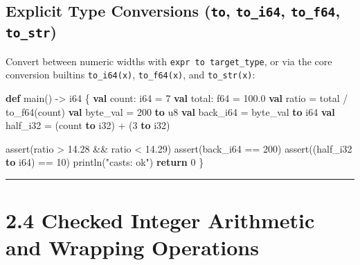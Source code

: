 \documentclass[
  english,
  oneside]{book}
\newenvironment{Shaded}{\begin{snugshade}}{\end{snugshade}}
\newcommand{\ControlFlowTok}[1]{\textcolor[rgb]{0.77,0.53,0.75}{\textbf{#1}}}
\newcommand{\DataTypeTok}[1]{\textcolor[rgb]{0.31,0.79,0.69}{#1}}
\newcommand{\DecValTok}[1]{\textcolor[rgb]{0.71,0.81,0.66}{#1}}
\newcommand{\FloatTok}[1]{\textcolor[rgb]{0.71,0.81,0.66}{#1}}
\newcommand{\FunctionTok}[1]{\textcolor[rgb]{0.86,0.86,0.67}{#1}}
\newcommand{\KeywordTok}[1]{\textcolor[rgb]{0.34,0.61,0.84}{\textbf{#1}}}
\newcommand{\NormalTok}[1]{\textcolor[rgb]{0.83,0.83,0.83}{#1}}
\newcommand{\OperatorTok}[1]{\textcolor[rgb]{0.83,0.83,0.83}{#1}}
\newcommand{\StringTok}[1]{\textcolor[rgb]{0.81,0.57,0.47}{#1}}
\begin{document}
\subsection{\texorpdfstring{Explicit Type Conversions (\texttt{to},
\texttt{to\_i64}, \texttt{to\_f64},
\texttt{to\_str})}{Explicit Type Conversions (to, to\_i64, to\_f64, to\_str)}}\label{explicit-type-conversions-to-to_i64-to_f64-to_str}

Convert between numeric widths with \texttt{expr\ to\ target\_type}, or
via the core conversion builtins \texttt{to\_i64(x)},
\texttt{to\_f64(x)}, and \texttt{to\_str(x)}:

\begin{Shaded}
\begin{Highlighting}[]
\KeywordTok{def}\NormalTok{ main() }\OperatorTok{{-}\textgreater{}} \DataTypeTok{i64}\NormalTok{ \{}
    \KeywordTok{val}\NormalTok{ count: }\DataTypeTok{i64} \OperatorTok{=} \DecValTok{7}
    \KeywordTok{val}\NormalTok{ total: }\DataTypeTok{f64} \OperatorTok{=} \FloatTok{100.0}
    \KeywordTok{val}\NormalTok{ ratio }\OperatorTok{=}\NormalTok{ total }\OperatorTok{/}\NormalTok{ to\_f64(count)}
    \KeywordTok{val}\NormalTok{ byte\_val }\OperatorTok{=} \DecValTok{200} \KeywordTok{to} \DataTypeTok{u8}
    \KeywordTok{val}\NormalTok{ back\_i64 }\OperatorTok{=}\NormalTok{ byte\_val }\KeywordTok{to} \DataTypeTok{i64}
    \KeywordTok{val}\NormalTok{ half\_i32 }\OperatorTok{=}\NormalTok{ (count }\KeywordTok{to} \DataTypeTok{i32}\NormalTok{) }\OperatorTok{+}\NormalTok{ (}\DecValTok{3} \KeywordTok{to} \DataTypeTok{i32}\NormalTok{)}

    \FunctionTok{assert}\NormalTok{(ratio }\OperatorTok{\textgreater{}} \FloatTok{14.28} \OperatorTok{\&\&}\NormalTok{ ratio }\OperatorTok{\textless{}} \FloatTok{14.29}\NormalTok{)}
    \FunctionTok{assert}\NormalTok{(back\_i64 }\OperatorTok{==} \DecValTok{200}\NormalTok{)}
    \FunctionTok{assert}\NormalTok{((half\_i32 }\KeywordTok{to} \DataTypeTok{i64}\NormalTok{) }\OperatorTok{==} \DecValTok{10}\NormalTok{)}
\NormalTok{    println(}\StringTok{"casts: ok"}\NormalTok{)}
    \ControlFlowTok{return} \DecValTok{0}
\NormalTok{\}}
\end{Highlighting}
\end{Shaded}

\begin{center}\rule{0.5\linewidth}{0.5pt}\end{center}

\section{2.4 Checked Integer Arithmetic and Wrapping
Operations}\label{checked-integer-arithmetic-and-wrapping-operations}
\end{document}

